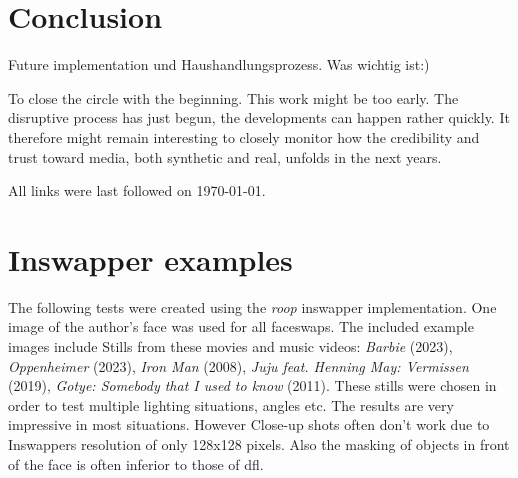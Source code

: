 \documentclass[
  a4paper,  %
  twoside,  %
  bibliography=totoc,
  headsepline,
  cleardoublepage=empty,
  parskip=half,
  draft=false
]{scrbook}
\begin{document}
\chapter{Conclusion}
\label{sec:conclusion}

Future implementation und Haushandlungsprozess. Was wichtig ist:) 

To close the circle with the beginning. This work might be too early. The disruptive process has just begun, the developments can happen rather quickly. It therefore might remain interesting to closely monitor how the credibility and trust toward media, both synthetic and real, unfolds in the next years. 






\printbibliography
All links were last followed on \today{}.

\appendix
\chapter{Inswapper examples}
\label{chap:insightface-demos}
The following tests were created using the \textit{roop} inswapper implementation. One image of the author's face was used for all faceswaps. The included example images include Stills from these movies and music videos: \textit{Barbie} (2023), \textit{Oppenheimer} (2023), \textit{Iron Man} (2008), \textit{Juju feat. Henning May: Vermissen} (2019), \textit{Gotye: Somebody that I used to know} (2011).
These stills were chosen in order to test multiple lighting situations, angles etc. The results are very impressive in most situations. However Close-up shots often don't work due to Inswappers resolution of only 128x128 pixels. Also the masking of objects in front of the face is often inferior to those of \gls{dfl}.
\end{document}
